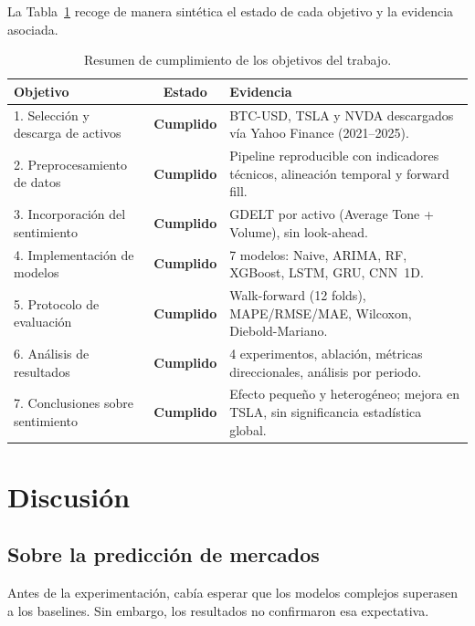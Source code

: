 La Tabla~\ref{tab:objetivos_cumplimiento} recoge de manera sintética el estado de cada objetivo y la evidencia asociada.

\begin{table}[H]
\centering
\caption{Resumen de cumplimiento de los objetivos del trabajo.}
\label{tab:objetivos_cumplimiento}
\small
\begin{tabular}{p{3.8cm}|c|p{6.5cm}}
\hline
\textbf{Objetivo} & \textbf{Estado} & \textbf{Evidencia} \\
\hline
1. Selección y descarga de activos & \textcolor{green!60!black}{\textbf{Cumplido}} & BTC-USD, TSLA y NVDA descargados vía Yahoo Finance (2021--2025). \\
\hline
2. Preprocesamiento de datos & \textcolor{green!60!black}{\textbf{Cumplido}} & Pipeline reproducible con indicadores técnicos, alineación temporal y forward fill. \\
\hline
3. Incorporación del sentimiento & \textcolor{green!60!black}{\textbf{Cumplido}} & GDELT por activo (Average Tone + Volume), sin look-ahead. \\
\hline
4. Implementación de modelos & \textcolor{green!60!black}{\textbf{Cumplido}} & 7 modelos: Naive, ARIMA, RF, XGBoost, LSTM, GRU, CNN~1D. \\
\hline
5. Protocolo de evaluación & \textcolor{green!60!black}{\textbf{Cumplido}} & Walk-forward (12 folds), MAPE/RMSE/MAE, Wilcoxon, Diebold-Mariano. \\
\hline
6. Análisis de resultados & \textcolor{green!60!black}{\textbf{Cumplido}} & 4 experimentos, ablación, métricas direccionales, análisis por periodo. \\
\hline
7. Conclusiones sobre sentimiento & \textcolor{green!60!black}{\textbf{Cumplido}} & Efecto pequeño y heterogéneo; mejora en TSLA, sin significancia estadística global. \\
\hline
\end{tabular}
\end{table}

\section{Discusión}

\subsection{Sobre la predicción de mercados}

Antes de la experimentación, cabía esperar que los modelos complejos superasen a los baselines. Sin embargo, los resultados no confirmaron esa expectativa.


